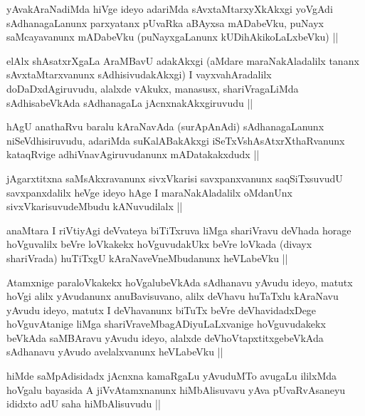 \begin{artha}
yAvakAraNadiMda hiVge ideyo adariMda sAvxtaMtarxyXkAkxgi yoVgAdi
sAdhanagaLanunx parxyatanx pUvaRka aBAyxsa mADabeVku, puNayx
saMcayavanunx mADabeVku (puNayxgaLanunx kUDihAkikoLaLxbeVku) ||
\end{artha}

\begin{artha}
elAlx shAsatxrXgaLa AraMBavU adakAkxgi (aMdare maraNakAladalilx tananx
sAvxtaMtarxvanunx sAdhisivudakAkxgi) I vayxvahAradalilx
doDaDxdAgiruvudu, alalxde vAkukx, manasusx, shariVragaLiMda
sAdhisabeVkAda sAdhanagaLa jAcnxnakAkxgiruvudu ||
\end{artha}

\begin{artha}
hAgU anathaRvu baralu kAraNavAda (surApAnAdi) sAdhanagaLanunx
niSeVdhisiruvudu, adariMda suKalABakAkxgi iSeTxVshAsAtxrXthaRvanunx
kataqRvige adhiVnavAgiruvudanunx mADatakakxdudx ||
\end{artha}

\begin{artha}
jAgarxtitxna saMsAkxravanunx sivxVkarisi savxpanxvanunx saqSiTxsuvudU
savxpanxdalilx heVge ideyo hAge I maraNakAladalilx oMdanUnx
sivxVkarisuvudeMbudu kANuvudilalx ||
\end{artha}

\begin{artha}
anaMtara I riVtiyAgi deVvateya biTiTxruva liMga shariVravu deVhada
horage hoVguvalilx beVre loVkakekx hoVguvudakUkx beVre loVkada (divayx
shariVrada) huTiTxgU kAraNaveVneMbudanunx heVLabeVku ||
\end{artha}

\begin{artha}
Atamxnige paraloVkakekx hoVgalubeVkAda sAdhanavu yAvudu ideyo, matutx
hoVgi alilx yAvudanunx anuBavisuvano, alilx deVhavu huTaTxlu kAraNavu
yAvudu ideyo, matutx I deVhavanunx biTuTx beVre deVhavidadxDege
hoVguvAtanige liMga shariVraveMbagADiyuLaLxvanige hoVguvudakekx
beVkAda saMBAravu yAvudu ideyo, alalxde deVhoVtapxtitxgebeVkAda
sAdhanavu yAvudo avelalxvanunx heVLabeVku ||
\end{artha}


\begin{artha}
hiMde saMpAdisidadx jAcnxna kamaRgaLu yAvuduMTo avugaLu ililxMda
hoVgalu bayasida A jiVvAtamxnanunx hiMbAlisuvavu yAva pUvaRvAsaneyu
ididxto adU saha hiMbAlisuvudu ||
\end{artha}


